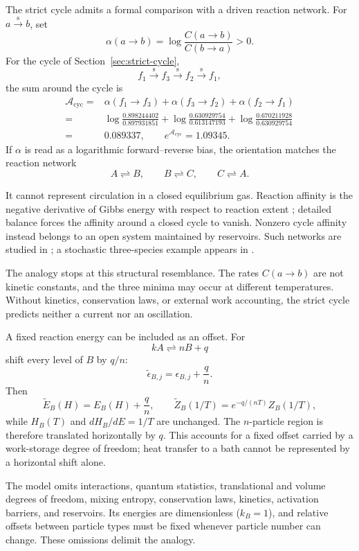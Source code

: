 \documentclass[11pt]{article}
\theoremstyle{definition}
\theoremstyle{remark}
\begin{document}
The strict cycle admits a formal comparison with a driven reaction network.
For \(a\overset{\mathrm{s}}{\longrightarrow}b\), set
\[
  \alpha(a\to b)
  =\log\frac{C(a\to b)}{C(b\to a)}>0.
\]
For the cycle of Section~\ref{sec:strict-cycle},
\[
  f_1\overset{\mathrm{s}}{\longrightarrow}f_3
  \overset{\mathrm{s}}{\longrightarrow}f_2
  \overset{\mathrm{s}}{\longrightarrow}f_1,
\]
the sum around the cycle is
\[
\begin{split}
  \mathcal A_{\mathrm{cyc}}
  ={}&\alpha(f_1\to f_3)+\alpha(f_3\to f_2)+\alpha(f_2\to f_1)\\
  ={}&
  \log\frac{0.898244402}{0.897931851}
  +\log\frac{0.630929754}{0.613147193}
  +\log\frac{0.670211928}{0.630929754}\\
  ={}&0.089337,
  \qquad e^{\mathcal A_{\mathrm{cyc}}}=1.09345.
\end{split}
\]
If \(\alpha\) is read as a logarithmic forward--reverse bias, the orientation
matches the reaction network
\[
  A\rightleftharpoons B,\qquad
  B\rightleftharpoons C,\qquad
  C\rightleftharpoons A.
\]

It cannot represent circulation in a closed equilibrium gas.  Reaction
affinity is the negative derivative of Gibbs energy with respect to reaction
extent \cite{iupac-affinity}; detailed balance forces the affinity around a
closed cycle to vanish.  Nonzero cycle affinity instead belongs to an open
system maintained by reservoirs.  Such networks are studied in
\cite{polettini-esposito-2014,rao-esposito-2016}; a stochastic
three-species example appears in \cite{schmiedl-seifert-2007}.

The analogy stops at this structural resemblance.  The rates \(C(a\to b)\)
are not kinetic constants, and the three minima may occur at different
temperatures.  Without kinetics, conservation laws, or external work
accounting, the strict cycle predicts neither a current nor an oscillation.

A fixed reaction energy can be included as an offset.  For
\[
  kA\rightleftharpoons nB+q
\]
shift every level of \(B\) by \(q/n\):
\[
  \widetilde\epsilon_{B,j}=\epsilon_{B,j}+\frac qn.
\]
Then
\[
  \widetilde E_B(H)=E_B(H)+\frac qn,\qquad
  \widetilde Z_B(1/T)=e^{-q/(nT)}Z_B(1/T),
\]
while \(H_B(T)\) and \(dH_B/dE=1/T\) are unchanged.  The \(n\)-particle
region is therefore translated horizontally by \(q\).  This accounts for a
fixed offset carried by a work-storage degree of freedom; heat transfer to a
bath cannot be represented by a horizontal shift alone.

The model omits interactions, quantum statistics, translational and volume
degrees of freedom, mixing entropy, conservation laws, kinetics, activation
barriers, and reservoirs.  Its energies are dimensionless (\(k_B=1\)), and
relative offsets between particle types must be fixed whenever particle
number can change.  These omissions delimit the analogy.
\end{document}
